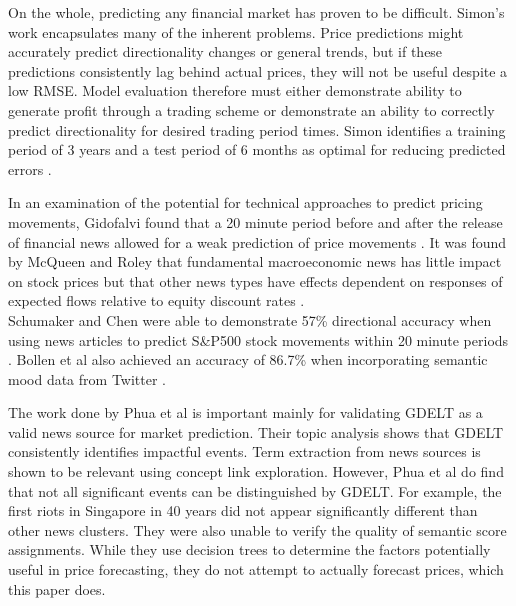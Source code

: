 On the whole, predicting any financial market has proven to be difficult. Simon's work encapsulates many of the inherent problems. Price predictions might accurately predict directionality changes or general trends, but if these predictions consistently lag behind actual prices, they will not be useful despite a low RMSE. Model evaluation therefore must either demonstrate ability to generate profit through a trading scheme or demonstrate an ability to correctly predict directionality for desired trading period times. Simon identifies a training period of 3 years and a test period of 6 months as optimal for reducing predicted errors \cite{forex_neuralnets}.

\noindent In an examination of the potential for technical approaches to predict pricing movements, Gidofalvi found that a 20 minute period before and after the release of financial news allowed for a weak prediction of price movements \cite{gidofalvi2001using}. It was found by McQueen and Roley that fundamental macroeconomic news has little impact on stock prices but that other news types have effects dependent on responses of expected flows relative to equity discount rates \cite{mcqueen1993stock}.\\

\noindent Schumaker and Chen were able to demonstrate 57\% directional accuracy when using news articles to predict S\&P500 stock movements within 20 minute periods \cite{schumaker2009textual}. Bollen et al also achieved an accuracy of 86.7\% when incorporating semantic mood data from Twitter \cite{bollen2011twitter}.

\noindent The work done by Phua et al is important mainly for validating GDELT as a valid news source for market prediction. Their topic analysis shows that GDELT consistently identifies impactful events. Term extraction from news sources is shown to be relevant using concept link exploration. However, Phua et al do find that not all significant events can be distinguished by GDELT. For example, the first riots in Singapore in 40 years did not appear significantly different than other news clusters. They were also unable to verify the quality of semantic score assignments. While they use decision trees to determine the factors potentially useful in price forecasting, they do not attempt to actually forecast prices, which this paper does.